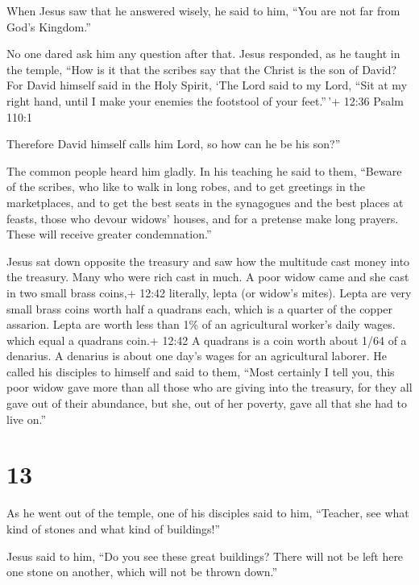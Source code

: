  When Jesus saw that he answered wisely, he said to him,
``You are not far from God's Kingdom.''

No one dared ask him any question after that.  Jesus
responded, as he taught in the temple, ``How is it that the scribes say
that the Christ is the son of David?  For David himself
said in the Holy Spirit, `The Lord said to my Lord, ``Sit at my right
hand, until I make your enemies the footstool of your feet.''\,'+ 12:36
Psalm 110:1

 Therefore David himself calls him Lord, so how can he be
his son?''

The common people heard him gladly.  In his teaching he
said to them, ``Beware of the scribes, who like to walk in long robes,
and to get greetings in the marketplaces,  and to get the
best seats in the synagogues and the best places at feasts,
 those who devour widows' houses, and for a pretense make
long prayers. These will receive greater condemnation.''

 Jesus sat down opposite the treasury and saw how the
multitude cast money into the treasury. Many who were rich cast in much.
 A poor widow came and she cast in two small brass coins,+
12:42 literally, lepta (or widow's mites). Lepta are very small brass
coins worth half a quadrans each, which is a quarter of the copper
assarion. Lepta are worth less than 1\% of an agricultural worker's
daily wages. which equal a quadrans coin.+ 12:42 A quadrans is a coin
worth about 1/64 of a denarius. A denarius is about one day's wages for
an agricultural laborer.  He called his disciples to
himself and said to them, ``Most certainly I tell you, this poor widow
gave more than all those who are giving into the treasury, 
for they all gave out of their abundance, but she, out of her poverty,
gave all that she had to live on.''

\hypertarget{section-12}{%
\section{13}\label{section-12}}

 As he went out of the temple, one of his disciples said to
him, ``Teacher, see what kind of stones and what kind of buildings!''

 Jesus said to him, ``Do you see these great buildings?
There will not be left here one stone on another, which will not be
thrown down.''

